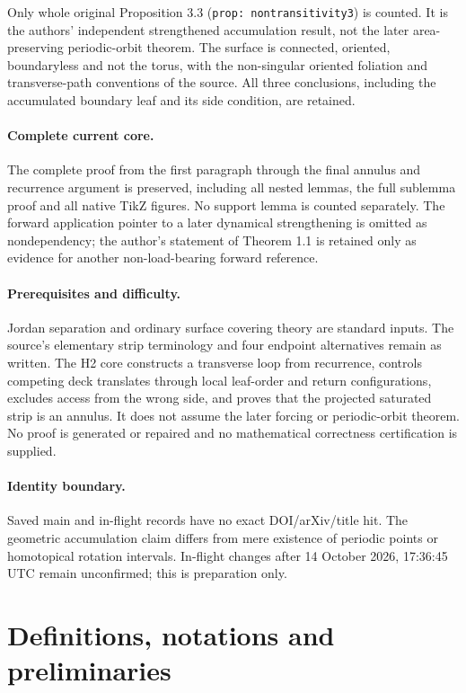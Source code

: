 \documentclass[10pt,a4paper]{article}
\theoremstyle{definition}
\theoremstyle{plain}
\numberwithin{equation}{section}
\numberwithin{figure}{section}
\begin{document}
Only whole original Proposition 3.3 (\texttt{prop: nontransitivity3}) is counted. It is the authors' independent strengthened accumulation result, not the later area-preserving periodic-orbit theorem. The surface is connected, oriented, boundaryless and not the torus, with the non-singular oriented foliation and transverse-path conventions of the source. All three conclusions, including the accumulated boundary leaf and its side condition, are retained.

\paragraph{Complete current core.} The complete proof from the first paragraph through the final annulus and recurrence argument is preserved, including all nested lemmas, the full sublemma proof and all native TikZ figures. No support lemma is counted separately. The forward application pointer to a later dynamical strengthening is omitted as nondependency; the author's statement of Theorem 1.1 is retained only as evidence for another non-load-bearing forward reference.

\paragraph{Prerequisites and difficulty.} Jordan separation and ordinary surface covering theory are standard inputs. The source's elementary strip terminology and four endpoint alternatives remain as written. The H2 core constructs a transverse loop from recurrence, controls competing deck translates through local leaf-order and return configurations, excludes access from the wrong side, and proves that the projected saturated strip is an annulus. It does not assume the later forcing or periodic-orbit theorem. No proof is generated or repaired and no mathematical correctness certification is supplied.

\paragraph{Identity boundary.} Saved main and in-flight records have no exact DOI/arXiv/title hit. The geometric accumulation claim differs from mere existence of periodic points or homotopical rotation intervals. In-flight changes after 14 October 2026, 17:36:45 UTC remain unconfirmed; this is preparation only.

\setcounter{section}{1}

\section{Definitions, notations and preliminaries}\label{s:preliminaries}
\end{document}

